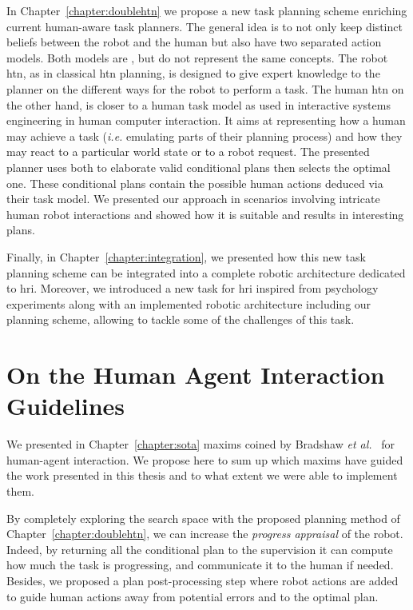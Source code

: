 \documentclass[a4paper,11pt,twoside]{StyleThese}
\begin{document}
In Chapter~\ref{chapter:doublehtn} we propose a new task planning scheme enriching current human-aware task planners. The general idea is to not only keep distinct beliefs between the robot and the human but also have two separated action models. Both models are , but do not represent the same concepts. The robot \acrshort{htn}, as in classical \acrshort{htn} planning, is designed to give expert knowledge to the planner on the different ways for the robot to perform a task. The human \acrshort{htn} on the other hand, is closer to a human task model as used in interactive systems engineering in human computer interaction. It aims at representing how a human may achieve a task (\textit{i.e.} emulating parts of their planning process) and how they may react to a particular world state or to a robot request. The presented planner uses both  to elaborate valid conditional plans then selects the optimal one. These conditional plans contain the possible human actions deduced via their task model. We presented our approach in scenarios involving intricate human robot interactions and showed how it is suitable and results in interesting plans. 

Finally, in Chapter~\ref{chapter:integration}, we presented how this new task planning scheme can be integrated into a complete robotic architecture dedicated to \acrshort{hri}. Moreover, we introduced a new task for \acrshort{hri} inspired from psychology experiments along with an implemented robotic architecture including our planning scheme, allowing to tackle some of the challenges of this task.

\section*{On the Human Agent Interaction Guidelines}
We presented in Chapter~\ref{chapter:sota} maxims coined by Bradshaw \textit{et al.}~\cite{bradshaw2011human} for human-agent interaction. We propose here to sum up which maxims have guided the work presented in this thesis and to what extent we were able to implement them.

By completely exploring the search space with the proposed planning method of Chapter~\ref{chapter:doublehtn}, we can increase the \textit{progress appraisal} of the robot. Indeed, by returning all the conditional plan to the supervision it can compute how much the task is progressing, and communicate it to the human if needed. Besides, we proposed a plan post-processing step where robot actions are added to guide human actions away from potential errors and to the optimal plan.
\end{document}
